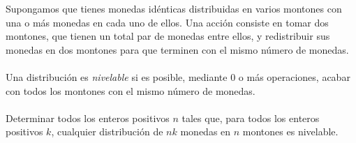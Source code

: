 Supongamos que tienes monedas idénticas distribuidas en varios montones con una o más monedas en cada uno de ellos. Una acción consiste en tomar dos montones, que tienen un total par de monedas entre ellos, y redistribuir sus monedas en dos montones para que terminen con el mismo número de monedas. \\\\
Una distribución es \textit{nivelable} si es posible, mediante 0 o más operaciones, acabar con todos los montones con el mismo número de monedas. \\\\
Determinar todos los enteros positivos $n$ tales que, para todos los enteros positivos $k$, cualquier distribución de $nk$ monedas en $n$ montones es nivelable.
